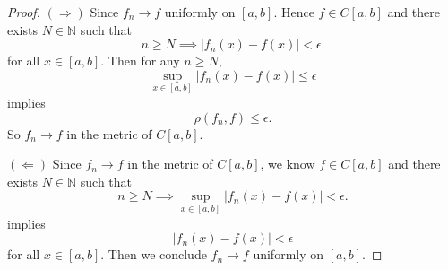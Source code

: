 \begin{Exercise}
\begin{proof}
$(\Longrightarrow)$
Since $f_n\to f$ uniformly on $[a,b]$. Hence $f\in C[a,b]$ and there exists $N\in\mathbb{N}$ such that
$$
n\geq N \implies \left| f_n(x)-f(x) \right| < \epsilon.
$$
for all $x\in[a,b]$. Then for any $n\geq N$,
$$
\sup_{x\in[a,b]} \left| f_n(x)-f(x) \right| \leq \epsilon
$$
implies
$$
\rho(f_n, f) \leq \epsilon.
$$
So $f_n \to f$ in the metric of $C[a,b]$.

\vspace{2ex}

$(\Longleftarrow)$
Since $f_n \to f$ in the metric of $C[a,b]$, we know $f\in C[a,b]$ and there exists $N\in\mathbb{N}$ such that
$$
n\geq N \implies \sup_{x\in[a,b]} \left| f_n(x) - f(x) \right| < \epsilon.
$$
implies
$$
\left| f_n(x) - f(x) \right| < \epsilon
$$
for all $x\in[a,b]$. Then we conclude $f_n\to f$ uniformly on $[a,b]$.
\end{proof}
\end{Exercise}